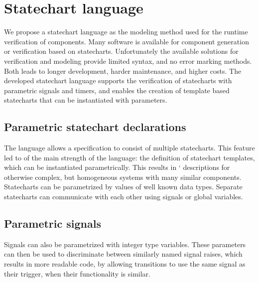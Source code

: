 \chapter{Statechart language}
\label{chap:runtime_verification}
We propose a statechart language as the modeling method used for the runtime verification of components. Many software is available for component generation or verification based on statecharts. Unfortunately the available solutions for verification and modeling provide limited syntax, and no error marking methods. Both leads to longer development, harder maintenance, and higher costs. The developed statechart language supports the verification of statecharts with parametric signals and timers, and enables the creation of template based statecharts that can be instantiated with parameters.
\section{Parametric statechart declarations}
The language allows a specification to consist of multiple statecharts. This feature led to of the main strength of the language: the definition of statechart templates, which can be instantiated parametrically. This results in ` descriptions for otherwise complex, but homogeneous systems with many similar components. Statecharts can be parametrized by values of well known data types. Separate statecharts can communicate with each other using signals or global variables.
\section{Parametric signals}
Signals can also be parametrized with integer type variables. These parameters can then be used to discriminate between similarly named signal raises, which results in more readable code, by allowing transitions to use the same signal as their trigger, when their functionality is similar.

